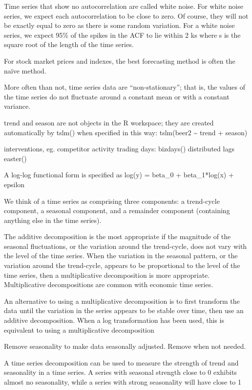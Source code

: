 \documentclass[]{book}
\begin{document}
Time series that show no autocorrelation are called white noise. For white noise series, we expect each autocorrelation to be close to zero. Of course, they will not be exactly equal to zero as there is some random variation. For a white noise series, we expect 95\% of the spikes in the ACF to lie within 2 ks where s is the square root of the length of the time series.

For stock market prices and indexes, the best forecasting method is often the naïve method.

More often than not, time series data are ``non-stationary''; that is, the values of the time series do not fluctuate around a constant mean or with a constant variance.

trend and season are not objects in the R workspace; they are created automatically by tslm() when specified in this way: tslm(beer2 \textasciitilde{} trend + season)

interventions, eg. competitor activity \textbar{} trading days: bizdays() \textbar{} distributed lags \textbar{} easter()

A log-log functional form is specified as log(y) = beta\_0 + beta\_1*log(x) + epsilon

We think of a time series as comprising three components: a trend-cycle component, a seasonal component, and a remainder component (containing anything else in the time series).

The additive decomposition is the most appropriate if the magnitude of the seasonal fluctuations, or the variation around the trend-cycle, does not vary with the level of the time series. When the variation in the seasonal pattern, or the variation around the trend-cycle, appears to be proportional to the level of the time series, then a multiplicative decomposition is more appropriate. Multiplicative decompositions are common with economic time series.

An alternative to using a multiplicative decomposition is to first transform the data until the variation in the series appears to be stable over time, then use an additive decomposition. When a log transformation has been used, this is equivalent to using a multiplicative decomposition

Remove seasonality to make data seasonally adjusted. Remove when not needed.

A time series decomposition can be used to measure the strength of trend and seasonality in a time series. A series with seasonal strength close to 0 exhibits almost no seasonality, while a series with strong seasonality will have close to 1
\end{document}
